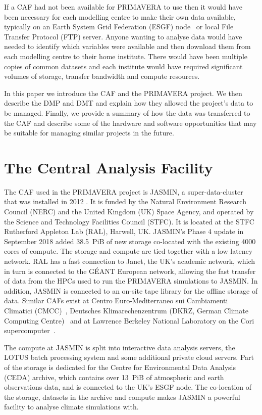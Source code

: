 \documentclass[gmd, manuscript]{copernicus}
\begin{document}
If a CAF had not been available for PRIMAVERA to use then it would have been necessary for each modelling centre to make their own data available, typically on an Earth System Grid Federation (ESGF) node~\citep{ESGFCinquini}\citep{gmd-14-629-2021} or local File Transfer Protocol (FTP) server. Anyone wanting to analyse data would have needed to identify which variables were available and then download them from each modelling centre to their home institute. There would have been multiple copies of common datasets and each institute would have required significant volumes of storage, transfer bandwidth and compute resources.

In this paper we introduce the CAF and the PRIMAVERA project. We then describe the DMP and DMT and explain how they allowed the project's data to be managed. Finally, we provide a summary of how the data was transferred to the CAF and describe some of the hardware and software opportunities that may be suitable for managing similar projects in the future.

\section{The Central Analysis Facility}

The CAF used in the PRIMAVERA project is JASMIN, a super-data-cluster that was installed in 2012 \citep{lawrence2013storing}. It is funded by the Natural Environment Research Council (NERC) and the United Kingdom (UK) Space Agency, and operated by the Science and Technology Facilities Council (STFC). It is located at the STFC Rutherford Appleton Lab (RAL), Harwell, UK. JASMIN's Phase 4 update in September 2018 added 38.5~PiB of new storage co-located with the existing 4000 cores of compute. The storage and compute are tied together with a low latency network. RAL has a fast connection to Janet, the UK's academic network, which in turn is connected to the G\'{E}ANT European network, allowing the fast transfer of data from the HPCs used to run the PRIMAVERA simulations to JASMIN. In addition, JASMIN is connected to an on-site tape library for the offline storage of data. Similar CAFs exist at Centro Euro-Mediterraneo sui Cambiamenti Climatici (CMCC)~\citep{CMCC}, Deutsches Klimarechenzentrum (DKRZ, German Climate Computing Centre)~\citep{dkrz} and at Lawrence Berkeley National Laboratory on the Cori supercomputer~\citep{cori}.

The compute at JASMIN is split into interactive data analysis servers, the LOTUS batch processing system and some additional private cloud servers. Part of the storage is dedicated for the Centre for Environmental Data Analysis (CEDA) archive, which contains over 13~PiB of atmospheric and earth observations data, and is connected to the UK's ESGF node. The co-location of the storage, datasets in the archive and compute makes JASMIN a powerful facility to analyse climate simulations with.
\end{document}
